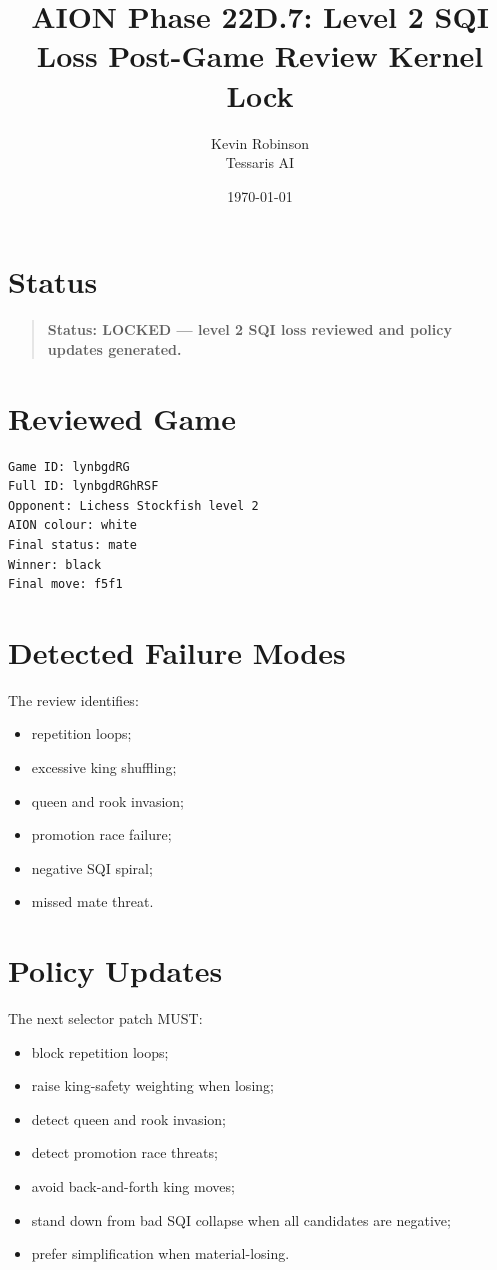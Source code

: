 \documentclass[11pt,a4paper]{article}
\title{\textbf{AION Phase 22D.7: Level 2 SQI Loss Post-Game Review Kernel Lock}}
\author{Kevin Robinson\\Tessaris AI}
\date{\today}
\begin{document}
\maketitle

\section{Status}

\begin{quote}
\textbf{Status: LOCKED --- level 2 SQI loss reviewed and policy updates generated.}
\end{quote}

\section{Reviewed Game}

\begin{verbatim}
Game ID: lynbgdRG
Full ID: lynbgdRGhRSF
Opponent: Lichess Stockfish level 2
AION colour: white
Final status: mate
Winner: black
Final move: f5f1
\end{verbatim}

\section{Detected Failure Modes}

The review identifies:

\begin{itemize}
  \item repetition loops;
  \item excessive king shuffling;
  \item queen and rook invasion;
  \item promotion race failure;
  \item negative SQI spiral;
  \item missed mate threat.
\end{itemize}

\section{Policy Updates}

The next selector patch MUST:

\begin{itemize}
  \item block repetition loops;
  \item raise king-safety weighting when losing;
  \item detect queen and rook invasion;
  \item detect promotion race threats;
  \item avoid back-and-forth king moves;
  \item stand down from bad SQI collapse when all candidates are negative;
  \item prefer simplification when material-losing.
\end{itemize}
\end{document}
